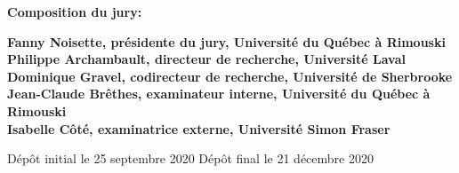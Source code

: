 \thispagestyle{empty}

\null
\vfill
\noindent \textbf{Composition du jury:}\\
\vspace{1cm}

\begin{singlespace}
  \noindent \textbf{Fanny Noisette, présidente du jury, Université du Québec à Rimouski}\\

  \noindent \textbf{Philippe Archambault, directeur de recherche, Université Laval}\\

  \noindent \textbf{Dominique Gravel, codirecteur de recherche, Université de Sherbrooke}\\

  \noindent \textbf{Jean-Claude Brêthes, examinateur interne, Université du Québec à Rimouski}\\

  \noindent \textbf{Isabelle Côté, examinatrice externe, Université Simon Fraser}\\
\end{singlespace}

\vspace{2cm}
\noindent Dépôt initial le 25 septembre 2020
\hspace{3cm}
\noindent Dépôt final le 21 décembre 2020


\cleardoublepage
